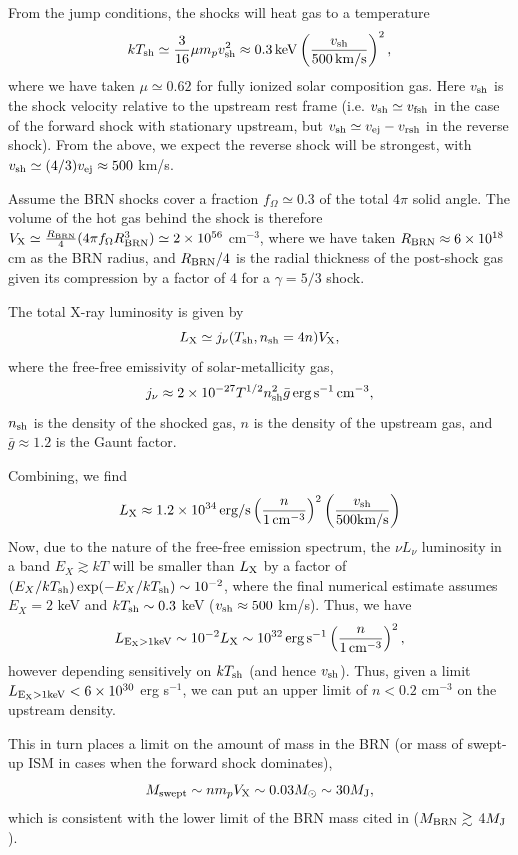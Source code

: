 \documentclass[linenumbers]{aastex631}
\newcommand{\be}{\begin{equation}}
\newcommand{\ee}{\end{equation}}
\begin{document}
From the jump conditions, the shocks will heat gas to a temperature
\be
kT_{\rm sh} \simeq \frac{3}{16}\mu m_p v_{\rm sh}^{2} \approx 0.3\,{\rm keV}\left(\frac{v_{\rm sh}}{500\,{\rm km/s}}\right)^{2},
\ee
where we have taken $\mu \simeq 0.62$ for fully ionized solar composition gas.  Here $v_{\rm sh}$ is the shock velocity relative to the upstream rest frame (i.e. $v_{\rm sh} \simeq v_{\rm fsh}$ in the case of the forward shock with stationary upstream, but $v_{\rm sh} \simeq v_{\rm ej}-v_{\rm rsh}$ in the reverse shock).  From the above, we expect the reverse shock will be strongest, with $v_{\rm sh} \simeq (4/3)v_{\rm ej} \approx 500$ km/s.

Assume the BRN shocks cover a fraction $f_{\Omega} \simeq 0.3$ of the total 4$\pi$ solid angle.  The volume of the hot gas behind the shock is therefore $V_{\rm X} \simeq \frac{R_{\rm BRN}}{4}(4\pi f_{\Omega} R_{\rm BRN}^{3}) \simeq 2\times 10^{56}$ cm$^{-3}$, where we have taken $R_{\rm BRN} \approx 6\times 10^{18}$ cm as the BRN radius, and $R_{\rm BRN}/4$ is the radial thickness of the post-shock gas given its compression by a factor of 4 for a $\gamma = 5/3$ shock.

The total X-ray luminosity is given by
\be
L_{\rm X} \simeq j_{\nu}(T_{\rm sh},n_{\rm sh} = 4 n)V_{\rm X},
\ee
where the free-free emissivity of solar-metallicity gas,
\be
j_{\nu} \approx 2\times 10^{-27}T^{1/2}n_{\rm sh}^{2}\bar{g}\,{\rm erg\,s^{-1}\,cm^{-3}},
\ee
$n_{\rm sh}$ is the density of the shocked gas, $n$ is the density of the upstream gas, and $\bar{g} \approx 1.2$ is the Gaunt factor.

Combining, we find
\be
L_{\rm X} \approx 1.2\times 10^{34}\,{\rm erg/s}\left(\frac{n}{1\,{\rm cm^{-3}}}\right)^{2}\left(\frac{v_{\rm sh}}{500{\rm km/s}}\right)
\ee
Now, due to the nature of the free-free emission spectrum, the $\nu L_{\nu}$ luminosity in a band $E_X \gtrsim kT$ will be smaller than $L_{\rm X}$ by a factor of $(E_X/kT_{\rm sh})\exp(-E_X/kT_{\rm sh}) \sim 10^{-2}$, where the final numerical estimate assumes $E_X = 2$ keV and $kT_{\rm sh} \sim 0.3$ keV ($v_{\rm sh} \approx 500$ km/s).  Thus, we have
\be
L_{\rm E_X > 1 keV} \sim 10^{-2}L_{\rm X} \sim 10^{32}\,{\rm erg\,s^{-1}}\left(\frac{n}{1\,{\rm cm^{-3}}}\right)^{2},
\ee
however depending sensitively on $kT_{\rm sh}$ (and hence $v_{\rm sh}$).  Thus, given a limit $L_{\rm E_X > 1 keV}  < 6\times 10^{30}$ erg s$^{-1}$, we can put an upper limit of $n < 0.2$ cm$^{-3}$ on the upstream density.

This in turn places a limit on the amount of mass in the BRN (or mass of swept-up ISM in cases when the forward shock dominates),
\be
M_{\rm swept} \sim n m_p V_{\rm X} \sim 0.03M_{\odot} \sim 30M_{\rm J},
\ee
which is consistent with the lower limit of the BRN mass cited in \citet{2020Natur.587..387H} ($M_{\rm BRN} \gtrsim$ 4$M_{\rm J}$).
\end{document}
